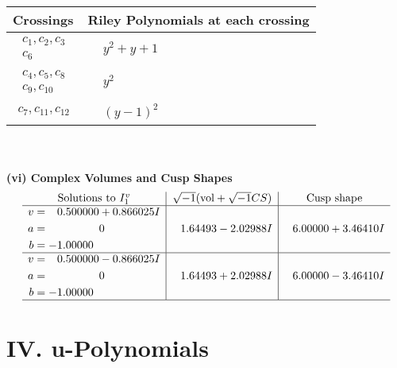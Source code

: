 \documentclass[1p]{elsarticle_modified}
\theoremstyle{definition}
\newcommand{\I}{\sqrt{-1}}
\begin{document}
\begin{tabular}{m{50pt}|m{274pt}}
Crossings & \hspace{64pt}Riley Polynomials at each crossing \\
\hline $$\begin{aligned}c_{1},c_{2},c_{3}\\c_{6}\end{aligned}$$&$\begin{aligned}
&y^2+y+1
\end{aligned}$\\
\hline $$\begin{aligned}c_{4},c_{5},c_{8}\\c_{9},c_{10}\end{aligned}$$&$\begin{aligned}
&y^2
\end{aligned}$\\
\hline $$\begin{aligned}c_{7},c_{11},c_{12}\end{aligned}$$&$\begin{aligned}
&(y-1)^2
\end{aligned}$\\
\hline
\end{tabular}\\~\\
\newpage\flushleft \textbf{(vi) Complex Volumes and Cusp Shapes}
$$\begin{array}{c|c|c}  
\text{Solutions to }I^v_{1}& \I (\text{vol} + \sqrt{-1}CS) & \text{Cusp shape}\\
 \hline 
\begin{aligned}
v &= \phantom{-}0.500000 + 0.866025 I \\
a &= \phantom{-0.000000 } 0 \\
b &= -1.00000\phantom{ +0.000000I}\end{aligned}
 & \phantom{-}1.64493 - 2.02988 I & \phantom{-}6.00000 + 3.46410 I \\ \hline\begin{aligned}
v &= \phantom{-}0.500000 - 0.866025 I \\
a &= \phantom{-0.000000 } 0 \\
b &= -1.00000\phantom{ +0.000000I}\end{aligned}
 & \phantom{-}1.64493 + 2.02988 I & \phantom{-}6.00000 - 3.46410 I\\
 \hline 
 \end{array}$$\newpage
\newpage\renewcommand{\arraystretch}{1}
\centering \section*{ IV. u-Polynomials}
\end{document}
